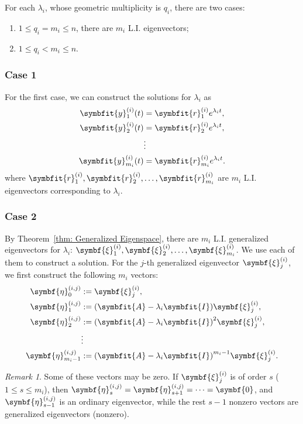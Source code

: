 \documentclass[10pt,UTF8]{article}
\newcommand{\mat}[1]{\symbfit{#1}}
\renewcommand{\vec}[1]{%
  \ifnum0\ifcat#1a1\else0\fi>0
  \symbfit{#1}  %
  \else
  \symbf{#1}  %
  \fi
}
\theoremstyle{definition}
\newtheorem{definition inner}{Definition}[section]
\theoremstyle{definition}
\newtheorem{theorem inner}{Theorem}[section]
\theoremstyle{definition}
\newtheorem*{proof inner}{\textit{Proof}}
\theoremstyle{plain}
\newtheorem{tip inner}{Tip}[section]
\theoremstyle{remark}
\newtheorem*{remark}{\textit{Remark}}
\begin{document}
For each \(\lambda_i\), whose geometric multiplicity is \(q_i\),
there are two cases:
\begin{enumerate}
  \item \(1 \leqslant q_i = m_i \leqslant n\),
    there are \(m_i\) L.I. eigenvectors;
  \item \(1 \leqslant q_i < m_i \leqslant n\).
\end{enumerate}

\subsubsection*{Case 1}

For the first case, we can construct the solutions for \(\lambda_i\) as
\begin{align*}
  \vec{y}^{(i)}_1(t) &= \vec{r}^{(i)}_1 e^{\lambda_i t}, \\
  \vec{y}^{(i)}_2(t) &= \vec{r}^{(i)}_2 e^{\lambda_i t}, \\
  &\vdots \\
  \vec{y}^{(i)}_{m_i}(t) &= \vec{r}^{(i)}_{m_i} e^{\lambda_i t}.
\end{align*}
where \(\vec{r}^{(i)}_1, \vec{r}^{(i)}_2, \ldots, \vec{r}^{(i)}_{m_i}\)
are \(m_i\) L.I. eigenvectors
corresponding to \(\lambda_i\).

\subsubsection*{Case 2}

By Theorem~\ref{thm: Generalized Eigenspace},
there are \(m_i\) L.I. generalized eigenvectors for \(\lambda_i\):
\(\vec{\xi}^{(i)}_1, \vec{\xi}^{(i)}_2, \ldots, \vec{\xi}^{(i)}_{m_i}\).
We use each of them to construct a solution.
For the \(j\)-th generalized eigenvector \(\vec{\xi}^{(i)}_j\),
we first construct the following \(m_i\) vectors:
\begin{align*}
  \vec{\eta}^{(i,j)}_0 &:= \vec{\xi}^{(i)}_j, \\
  \vec{\eta}^{(i,j)}_1 &:= (\mat{A} - \lambda_i \mat{I}) \vec{\xi}^{(i)}_j, \\
  \vec{\eta}^{(i,j)}_2 &:= {(\mat{A} - \lambda_i \mat{I})}^2
  \vec{\xi}^{(i)}_j, \\
  &\vdots \\
  \vec{\eta}^{(i,j)}_{m_i-1} &:= {(\mat{A} - \lambda_i \mat{I})}^{m_i-1}
  \vec{\xi}^{(i)}_j.
\end{align*}
\begin{remark}
  Some of these vectors may be zero. If \(\vec{\xi}^{(i)}_j\)
  is of order \(s\) (\(1 \leqslant s \leqslant m_i\)),
  then \(\vec{\eta}^{(i,j)}_s = \vec{\eta}^{(i,j)}_{s+1} = \cdots = \vec{0}\),
  and \(\vec{\eta}^{(i,j)}_{s-1}\) is an ordinary eigenvector, while
  the rest \(s-1\) nonzero vectors are generalized eigenvectors (nonzero).
\end{remark}
\end{document}
